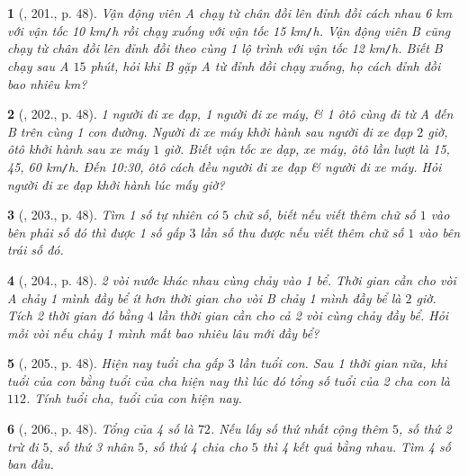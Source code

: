 \documentclass{article}
\newtheorem{baitoan}{}
\begin{document}
\begin{baitoan}[\cite{Tuyen_Toan_8}, 201., p. 48]
	Vận động viên A chạy từ chân đồi lên đỉnh đồi cách nhau {\rm6 km} với vận tốc {\rm10 km{\tt/}h} rồi chạy xuống với vận tốc {\rm15 km{\tt/}h}. Vận động viên B cũng chạy từ chân đồi lên đỉnh đồi theo cùng 1 lộ trình với vận tốc {\rm12 km{\tt/}h}. Biết B chạy sau A $15$ phút, hỏi khi B gặp A từ đỉnh đồi chạy xuống, họ cách đỉnh đồi bao nhiêu {\rm km}?
\end{baitoan}

\begin{baitoan}[\cite{Tuyen_Toan_8}, 202., p. 48]
	1 người đi xe đạp, 1 người đi xe máy, \& 1 ôtô cùng đi từ A đến B trên cùng 1 con đường. Người đi xe máy khởi hành sau người đi xe đạp $2$ giờ, ôtô khởi hành sau xe máy $1$ giờ. Biết vận tốc xe dạp, xe máy, ôtô lần lượt là {\rm15, 45, 60 km{\tt/}h}. Đến {\rm10:30}, ôtô cách đều người đi xe đạp \& người đi xe máy. Hỏi người đi xe đạp khởi hành lúc mấy giờ?
\end{baitoan}

\begin{baitoan}[\cite{Tuyen_Toan_8}, 203., p. 48]
	Tìm 1 số tự nhiên có $5$ chữ số, biết nếu viết thêm chữ số $1$ vào bên phải số đó thì được 1 số gấp $3$ lần số thu được nếu viết thêm chữ số $1$ vào bên trái số đó.
\end{baitoan}

\begin{baitoan}[\cite{Tuyen_Toan_8}, 204., p. 48]
	2 vòi nước khác nhau cùng chảy vào 1 bể. Thời gian cần cho vòi A chảy 1 mình đầy bể ít hơn thời gian cho vòi B chảy 1 mình đầy bể là $2$ giờ. Tích 2 thời gian đó bằng $4$ lần thời gian cần cho cả 2 vòi cùng chảy đầy bể. Hỏi mỗi vòi nếu chảy 1 mình mất bao nhiêu lâu mới đầy bể?
\end{baitoan}

\begin{baitoan}[\cite{Tuyen_Toan_8}, 205., p. 48]
	Hiện nay tuổi cha gấp $3$ lần tuổi con. Sau 1 thời gian nữa, khi tuổi của con bằng tuổi của cha hiện nay thì lúc đó tổng số tuổi của 2 cha con là $112$. Tính tuổi cha, tuổi của con hiện nay.
\end{baitoan}

\begin{baitoan}[\cite{Tuyen_Toan_8}, 206., p. 48]
	Tổng của 4 số là $72$. Nếu lấy số thứ nhất cộng thêm $5$, số thứ 2 trừ đi $5$, số thứ 3 nhân $5$, số thứ 4 chia cho $5$ thì 4 kết quả bằng nhau. Tìm 4 số ban đầu.
\end{baitoan}
\end{document}
